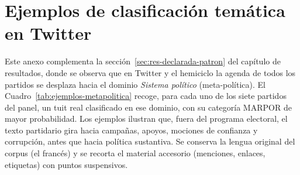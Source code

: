 \section{Ejemplos de clasificación temática en Twitter}
\label{anexo:ejemplos-tweets}

Este anexo complementa la sección~\ref{sec:res-declarada-patron} del capítulo de
resultados, donde se observa que en Twitter y el hemiciclo la agenda de todos los
partidos se desplaza hacia el dominio \emph{Sistema político} (meta-política). El
Cuadro~\ref{tab:ejemplos-metapolitica} recoge, para cada uno de los siete partidos
del panel, un tuit real clasificado en ese dominio, con su categoría MARPOR de
mayor probabilidad. Los ejemplos ilustran que, fuera del programa electoral, el
texto partidario gira hacia campañas, apoyos, mociones de confianza y corrupción,
antes que hacia política sustantiva. Se conserva la lengua original del corpus (el
francés) y se recorta el material accesorio (menciones, enlaces, etiquetas) con
puntos suspensivos.

